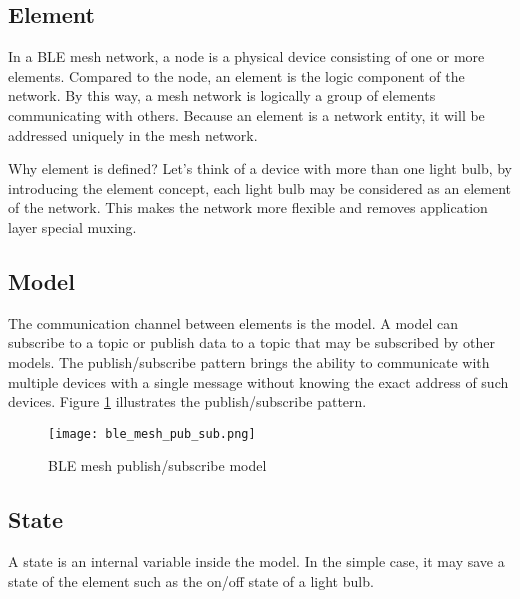 \documentclass[../../main.tex]{subfiles}
\begin{document}
\subsection{Element}
In a BLE mesh network, a node is a physical device consisting of one or more elements. Compared to the node, an element is the logic component of the network. By this way, a mesh network is logically a group of elements communicating with others. Because an element is a network entity, it will be addressed uniquely in the mesh network.

Why element is defined? Let's think of a device with more than one light bulb, by introducing the element concept, each light bulb may be considered as an element of the network. This makes the network more flexible and removes application layer special muxing.

\subsection{Model}
The communication channel between elements is the model. A model can subscribe to a topic or publish data to a topic that may be subscribed by other models. The publish/subscribe pattern brings the ability to  communicate with multiple devices with a single message without knowing the exact address of such devices. Figure \ref{fig:BLE mesh publish/subscribe model} illustrates the publish/subscribe pattern. 

\begin{figure}[ht]
    \begin{center}
        \texttt{[image: ble\_mesh\_pub\_sub.png]}
    \end{center}
    \caption{BLE mesh publish/subscribe model}
    \label{fig:BLE mesh publish/subscribe model}
\end{figure}

\subsection{State}
A state is an internal variable inside the model. In the simple case, it may save a state of the element such as the on/off state of a light bulb.
\end{document}
